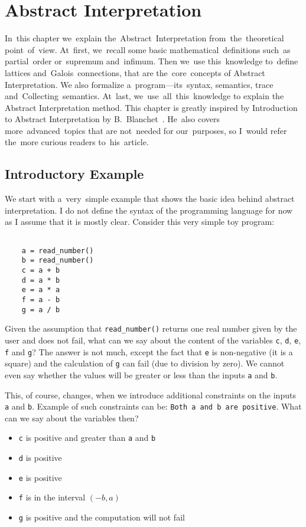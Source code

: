 \chapter{Abstract Interpretation}

In~this chapter we~explain the~Abstract~Interpretation from~the~theoretical point~of~view.
At~first, we~recall some basic mathematical~definitions such~as partial~order or~supremum and~infimum.
Then we~use this~knowledge to~define lattices and~Galois~connections, that are the~core~concepts of Abstract~
Interpretation.
We also formalize a~program---its~syntax, semantics, trace and~Collecting~semantics.
At~last, we~use~all~this~knowledge to explain the Abstract Interpretation method.
This chapter is greatly inspired by Introduction to Abstract Interpretation by B.~Blanchet~\cite{Blanchet:2002:AI}.
He~also covers more~advanced~topics that are not~needed for our~purposes, so I~would refer the~more curious readers
to~his~article.


\section{Introductory Example} %

We start with a~very~simple example that shows the basic idea behind abstract interpretation.
I do not define the syntax of the programming language for now as I assume that it is mostly clear.
Consider this very simple toy program:

\begin{verbatim}

    a = read_number()
    b = read_number()
    c = a + b
    d = a * b
    e = a * a
    f = a - b
    g = a / b

\end{verbatim}

Given the assumption that \verb|read_number()| returns one real number given by the user and does not fail, what can
we say about the content of the variables \verb|c|, \verb|d|, \verb|e|, \verb|f| and \verb|g|?
The answer is not much, except the fact that \verb|e| is non-negative (it is a square) and the calculation of \verb|g|
can fail (due to division by zero).
We cannot even say whether the values will be greater or less than the inputs \verb|a| and \verb|b|.

This, of course, changes, when we introduce additional constraints on the inputs \verb|a| and \verb|b|.
Example of such constraints can be: \verb|Both a and b are positive|.
What can we say about the variables then?
\begin{itemize}
    \item \verb|c| is positive and greater than \verb|a| and \verb|b|
    \item \verb|d| is positive
    \item \verb|e| is positive
    \item \verb|f| is in the interval $(-b, a)$
    \item \verb|g| is positive and the computation will not fail
\end{itemize}

